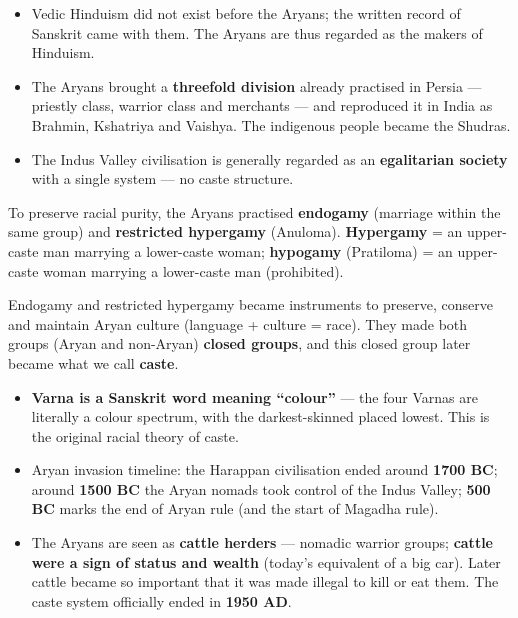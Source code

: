 \begin{itemize}
\item Vedic Hinduism did not exist before the Aryans; the written record of Sanskrit came with them. The Aryans are thus regarded as the makers of Hinduism.
\item The Aryans brought a \textbf{threefold division} already practised in Persia --- priestly class, warrior class and merchants --- and reproduced it in India as Brahmin, Kshatriya and Vaishya. The indigenous people became the Shudras.
\item The Indus Valley civilisation is generally regarded as an \textbf{egalitarian society} with a single system --- no caste structure.
\end{itemize}

\begin{KeyConcept}
To preserve racial purity, the Aryans practised \textbf{endogamy} (marriage within the same group) and \textbf{restricted hypergamy} (Anuloma). \textbf{Hypergamy} = an upper-caste man marrying a lower-caste woman; \textbf{hypogamy} (Pratiloma) = an upper-caste woman marrying a lower-caste man (prohibited).
\end{KeyConcept}

Endogamy and restricted hypergamy became instruments to preserve, conserve and maintain Aryan culture (language + culture = race). They made both groups (Aryan and non-Aryan) \textbf{closed groups}, and this closed group later became what we call \textbf{caste}.

\begin{DataFact}
\begin{itemize}
\item \textbf{Varna is a Sanskrit word meaning ``colour''} --- the four Varnas are literally a colour spectrum, with the darkest-skinned placed lowest. This is the original racial theory of caste.
\item Aryan invasion timeline: the Harappan civilisation ended around \textbf{1700 BC}; around \textbf{1500 BC} the Aryan nomads took control of the Indus Valley; \textbf{500 BC} marks the end of Aryan rule (and the start of Magadha rule).
\item The Aryans are seen as \textbf{cattle herders} --- nomadic warrior groups; \textbf{cattle were a sign of status and wealth} (today's equivalent of a big car). Later cattle became so important that it was made illegal to kill or eat them. The caste system officially ended in \textbf{1950 AD}.
\end{itemize}
\end{DataFact}

